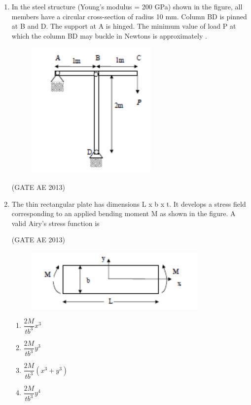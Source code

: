 \documentclass[journal,12pt,onecolumn]{IEEEtran}
\theoremstyle{remark}
\begin{document}
\begin{flushleft}
\begin{enumerate}
\item In the steel structure (Young's modulus = 200 GPa) shown in the figure, all members have a circular cross-section of radius 10 mm. Column BD is pinned at B and D. The support at A is hinged. The minimum value of load P at which the column BD may buckle in Newtons is approximately \underline{\hspace{2cm}}. 
\begin{figure}[H]
    \centering
    \includegraphics[width=0.5\columnwidth]{figs/41.png}
    \caption{}
    \label{fig:placeholder}
\end{figure}
\hfill(GATE AE 2013)

\item The thin rectangular plate has dimensions L x b x t. It develops a stress field corresponding to an applied bending moment M as shown in the figure. A valid Airy's stress function is

\hfill(GATE AE 2013)

\begin{figure}[H]
    \centering
    \includegraphics[width=0.5\columnwidth]{figs/42.png}
    \caption{}
    \label{fig:placeholder}
\end{figure}
\begin{multicols}{2}
\begin{enumerate}
\item $\dfrac{2M}{tb^3}x^3$
\item $\dfrac{2M}{tb^3}y^3$
\item $\dfrac{2M}{tb^3}(x^3+y^3)$
\item $\dfrac{2M}{tb^3}y^4$
\end{enumerate}
\end{multicols}


\end{enumerate}
\end{flushleft}
\end{document}
